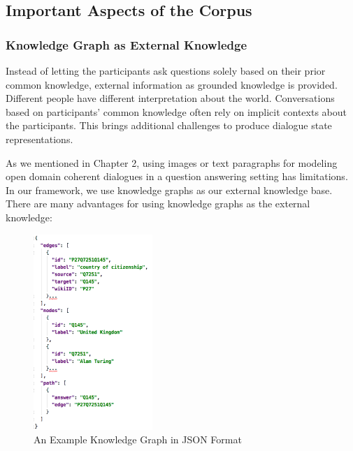 \documentclass[bsc,frontabs,twoside,singlespacing,parskip,deptreport]{infthesis}     %
\begin{document}
\subsection{Important Aspects of the Corpus}
\subsubsection*{Knowledge Graph as External Knowledge}

Instead of letting the participants ask questions solely based on their prior common knowledge, external information as grounded knowledge is provided. Different people have different interpretation about the world. Conversations based on participants' common knowledge often rely on implicit contexts about the participants. This brings additional challenges to produce dialogue state representations.

As we mentioned in Chapter 2, using images or text paragraphs for modeling open domain coherent dialogues in a question answering setting\cite{strub2017end,shekhar2017foil,reddy2019coqa,zhou2018dataset,de2017guesswhat,das2017visual,das2017learning,reddy2019coqa} has limitations. In our framework, we use knowledge graphs as our external knowledge base. There are many advantages for using knowledge graphs as the external knowledge:

\begin{figure}[h]
    \centering
    \includegraphics[width=0.4\textwidth]{gkjson.png}
    \caption{An Example Knowledge Graph in JSON Format}
    \label{fig:kgjson}
\end{figure}
\end{document}

